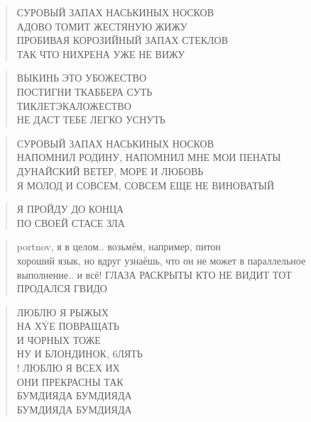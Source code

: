 \poemtitle{***}
\begin{verse}
СУРОВЫЙ ЗАПАХ НАСЬКИНЫХ НОСКОВ\\
АДОВО ТОМИТ ЖЕСТЯНУЮ ЖИЖУ\\
ПРОБИВАЯ КОРОЗИЙНЫЙ ЗАПАХ СТЕКЛОВ\\
ТАК ЧТО НИХРЕНА УЖЕ НЕ ВИЖУ
\end{verse}

\poemtitle{***}
\begin{verse}
ВЫКИНЬ ЭТО УБОЖЕСТВО\\
ПОСТИГНИ ТКАББЕРА СУТЬ\\
ТИКЛЕТЭКАЛОЖЕСТВО\\
НЕ ДАСТ ТЕБЕ ЛЕГКО УСНУТЬ
\end{verse}

\poemtitle{***}
\begin{verse}
СУРОВЫЙ ЗАПАХ НАСЬКИНЫХ НОСКОВ\\
НАПОМНИЛ РОДИНУ, НАПОМНИЛ МНЕ МОИ ПЕНАТЫ\\
ДУНАЙСКИЙ ВЕТЕР, МОРЕ И ЛЮБОВЬ\\
Я МОЛОД И СОВСЕМ, СОВСЕМ ЕЩЕ НЕ ВИНОВАТЫЙ
\end{verse}

\poemtitle{***}
\begin{verse}
Я ПРОЙДУ ДО КОНЦА\\
ПО СВОЕЙ СТАСЕ ЗЛА
\end{verse}

\poemtitle{***}
\begin{verse}
portnov, я в целом.. возьмём, например, питон\\
хороший язык, но вдруг узнаёшь, что он не может в параллельное выполнение.. и всё! ГЛАЗА РАСКРЫТЫ КТО НЕ ВИДИТ ТОТ ПРОДАЛСЯ ГВИДО
\end{verse}

\poemtitle{***}
\begin{verse}
ЛЮБЛЮ Я РЫЖЫХ\\
НА ХÝЕ ПОВРАЩАТЬ\\
И ЧОРНЫХ ТОЖЕ\\
НУ И БЛОНДИНОК, 6ЛЯТЬ\\!
ЛЮБЛЮ Я ВСЕХ ИХ\\
ОНИ ПРЕКРАСНЫ ТАК\\
БУМДИЯДА БУМДИЯДА\\
БУМДИЯДА БУМДИЯДА
\end{verse}

